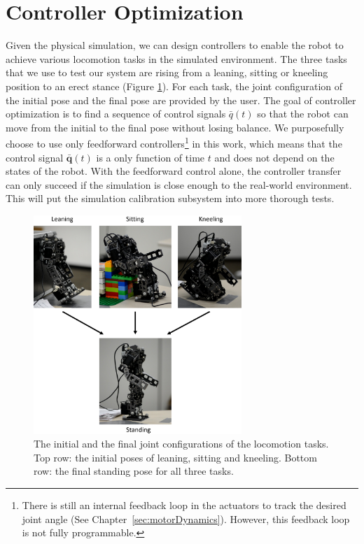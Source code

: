 \section{Controller Optimization}

Given the physical simulation, we can design controllers to enable the robot to achieve various locomotion tasks in the simulated environment. The three tasks that we use to test our system are rising from a leaning, sitting or kneeling position to an erect stance (Figure \ref{fig:task}). For each task, the joint configuration of the initial pose and the final pose are provided by the user. The goal of controller optimization is to find a sequence of control signals $\bar{q}(t)$ so that the robot can move from the initial to the final pose without losing balance. We purposefully choose to use only feedforward controllers\footnote{There is still an internal feedback loop in the actuators to track the desired joint angle (See Chapter~\ref{sec:motorDynamics}). However, this feedback loop is not fully programmable.} in this work, which means that the control signal $\bar{\mathbf{q}}(t)$ is a only function of time $t$ and does not depend on the states of the robot. With the feedforward control alone, the controller transfer can only succeed if the simulation is close enough to the real-world environment. This will put the simulation calibration subsystem into more thorough tests.

\begin{figure}[!t]
  \centering
  \includegraphics[width=0.7\textwidth]{figures/initialFinal}
  \caption{The initial and the final joint configurations of the locomotion tasks. Top row: the initial poses of leaning, sitting and kneeling. Bottom row: the final standing pose for all three tasks.}
  \label{fig:task}
\end{figure}


